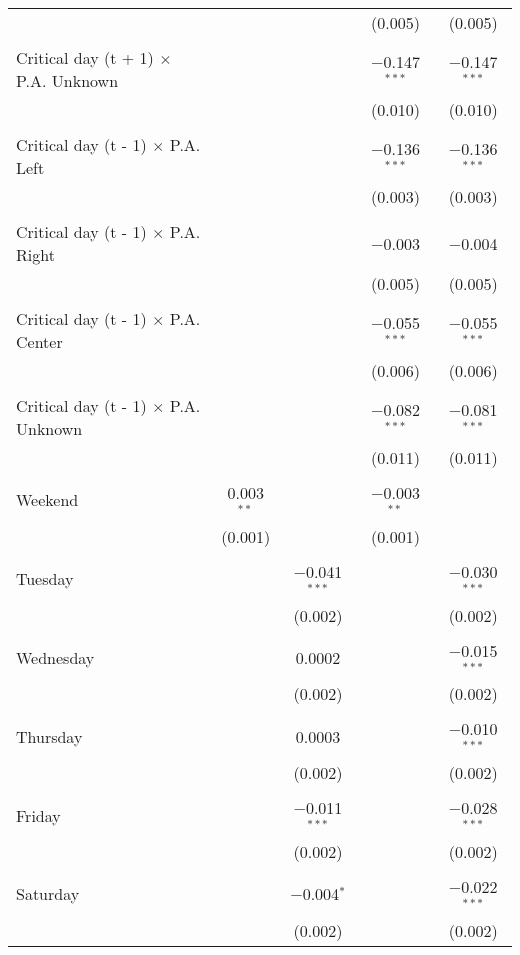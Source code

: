 \documentclass[
]{article}
\begin{document}
\begin{table}[!htbp]
{\begin{tabular}{@{\extracolsep{5pt}}lcccc}
  &  &  & (0.005) & (0.005) \\ 
  & & & & \\ 
 Critical day (t + 1) $\times$ P.A. Unknown &  &  & $-$0.147$^{***}$ & $-$0.147$^{***}$ \\ 
  &  &  & (0.010) & (0.010) \\ 
  & & & & \\ 
 Critical day (t - 1) $\times$ P.A. Left &  &  & $-$0.136$^{***}$ & $-$0.136$^{***}$ \\ 
  &  &  & (0.003) & (0.003) \\ 
  & & & & \\ 
 Critical day (t - 1) $\times$ P.A. Right &  &  & $-$0.003 & $-$0.004 \\ 
  &  &  & (0.005) & (0.005) \\ 
  & & & & \\ 
 Critical day (t - 1) $\times$ P.A. Center &  &  & $-$0.055$^{***}$ & $-$0.055$^{***}$ \\ 
  &  &  & (0.006) & (0.006) \\ 
  & & & & \\ 
 Critical day (t - 1) $\times$ P.A. Unknown &  &  & $-$0.082$^{***}$ & $-$0.081$^{***}$ \\ 
  &  &  & (0.011) & (0.011) \\ 
  & & & & \\ 
 Weekend & 0.003$^{**}$ &  & $-$0.003$^{**}$ &  \\ 
  & (0.001) &  & (0.001) &  \\ 
  & & & & \\ 
 Tuesday &  & $-$0.041$^{***}$ &  & $-$0.030$^{***}$ \\ 
  &  & (0.002) &  & (0.002) \\ 
  & & & & \\ 
 Wednesday &  & 0.0002 &  & $-$0.015$^{***}$ \\ 
  &  & (0.002) &  & (0.002) \\ 
  & & & & \\ 
 Thursday &  & 0.0003 &  & $-$0.010$^{***}$ \\ 
  &  & (0.002) &  & (0.002) \\ 
  & & & & \\ 
 Friday &  & $-$0.011$^{***}$ &  & $-$0.028$^{***}$ \\ 
  &  & (0.002) &  & (0.002) \\ 
  & & & & \\ 
 Saturday &  & $-$0.004$^{*}$ &  & $-$0.022$^{***}$ \\ 
  &  & (0.002) &  & (0.002) \\ 

\end{tabular}}
\end{table}
\end{document}
